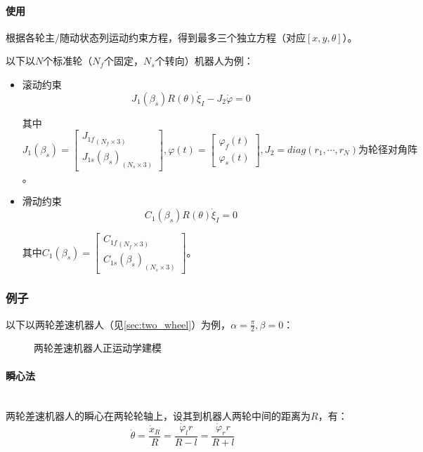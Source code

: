 \documentclass[
12pt, %
a4paper, 
oneside, %
headinclude,footinclude, %
]{scrartcl}
\begin{document}
\paragraph{使用}
根据各轮主/随动状态列运动约束方程，得到最多三个独立方程（对应$ [x, y ,\theta] $）。

以下以$ N $个标准轮（$ N_f $个固定，$ N_s $个转向）机器人为例：
\begin{itemize}
\item 滚动约束
$$ J_1(\beta_s) R(\theta) \dot{\xi}_I - J_2 \dot{\varphi} = 0 $$

其中$ J_1(\beta_s) =  \begin{bmatrix} {J_{1f}}_{(N_f \times 3)} \\ {J_{1s}(\beta_s)}_{(N_s \times 3)} \end{bmatrix}, \varphi(t) = \begin{bmatrix} \varphi_f(t) \\ \varphi_s(t) \end{bmatrix}, J_2 = diag(r_1, \cdots, r_N)\text{为轮径对角阵} $。
\item 滑动约束
$$ C_1(\beta_s) R(\theta) \dot{\xi}_I = 0 $$

其中$ C_1(\beta_s) = \begin{bmatrix} {C_{1f}}_{(N_f \times 3)} \\ {C_{1s}(\beta_s)}_{(N_s \times 3)} \end{bmatrix} $。
\end{itemize}
\subsubsection[例子]{例子}\label{sec:example1}
以下以两轮差速机器人（见\ref{sec:two_wheel}）为例，$ \alpha = \frac{\pi}{2}, \beta = 0 $：
\begin{figure}[H]
\centering
{} \quad
{}
\caption{两轮差速机器人正运动学建模}
\end{figure}
\paragraph{瞬心法}~\\

两轮差速机器人的瞬心在两轮轮轴上，设其到机器人两轮中间的距离为$ R $，有：
$$ \dot{\theta} = \frac{\dot{x}_R}{R} = \frac{\dot{\varphi}_l r}{R-l} = \frac{\dot{\varphi}_r r}{R+l} $$
\end{document}
